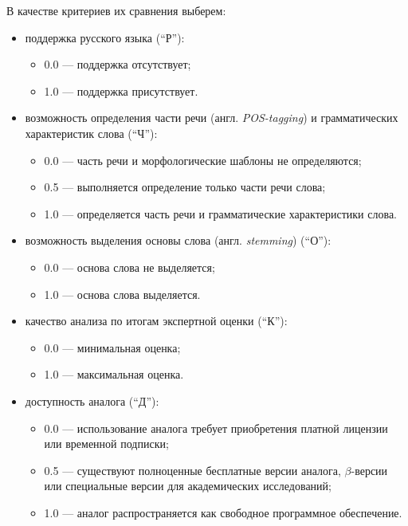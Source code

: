 В качестве критериев их сравнения выберем:
\begin{itemize}
  \item поддержка русского языка (``Р''):
  \begin{itemize}
    \item 0.0 — поддержка отсутствует;
    \item 1.0 — поддержка присутствует.
  \end{itemize}
  \item возможность определения части речи
(англ. \emph{POS-tagging}) и грамматических характеристик
слова (``Ч''):
  \begin{itemize}
    \item 0.0 — часть речи и морфологические шаблоны не
определяются;
    \item 0.5 — выполняется определение только части речи слова;
    \item 1.0 — определяется часть речи и грамматические
характеристики слова.
  \end{itemize}
  \item возможность выделения основы слова (англ.
\emph{stemming}) (``О''):
  \begin{itemize}
    \item 0.0 — основа слова не выделяется;
    \item 1.0 — основа слова выделяется.
  \end{itemize}
  \item качество анализа по итогам экспертной оценки (``К''):
  \begin{itemize}
    \item 0.0 — минимальная оценка;
    \item 1.0 — максимальная оценка.
  \end{itemize}
  \item доступность аналога (``Д''):
  \begin{itemize}
    \item 0.0 — использование аналога требует приобретения платной
лицензии или временной подписки;
    \item 0.5 — существуют полноценные бесплатные версии аналога,
$\beta$-версии или специальные версии для академических исследований;
    \item 1.0 — аналог распространяется как свободное программное
обеспечение.
  \end{itemize}
\end{itemize}


